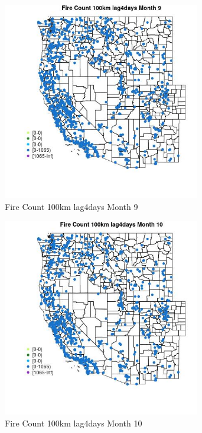 \begin{figure} 
\centering  
\includegraphics[width=0.77\textwidth]{Code_Outputs/Report_ML_input_PM25_Step4_part_f_de_duplicated_aves_prioritize_24hr_obswNAs_MapObsMo9Fire_Count_100km_lag4days.jpg} 
\caption{\label{fig:Report_ML_input_PM25_Step4_part_f_de_duplicated_aves_prioritize_24hr_obswNAsMapObsMo9Fire_Count_100km_lag4days}Fire Count 100km lag4days Month 9} 
\end{figure} 
 

\begin{figure} 
\centering  
\includegraphics[width=0.77\textwidth]{Code_Outputs/Report_ML_input_PM25_Step4_part_f_de_duplicated_aves_prioritize_24hr_obswNAs_MapObsMo10Fire_Count_100km_lag4days.jpg} 
\caption{\label{fig:Report_ML_input_PM25_Step4_part_f_de_duplicated_aves_prioritize_24hr_obswNAsMapObsMo10Fire_Count_100km_lag4days}Fire Count 100km lag4days Month 10} 
\end{figure} 
 

